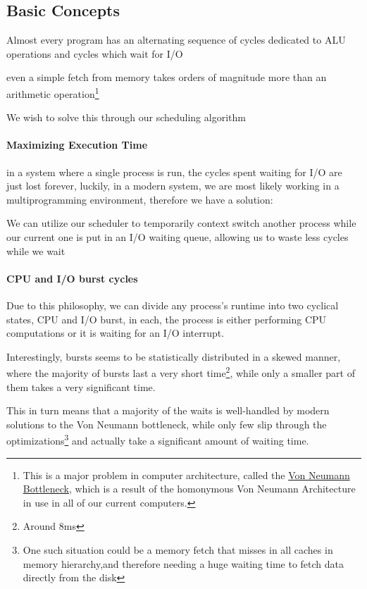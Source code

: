 \documentclass[openright, twoside]{report}
\theoremstyle{definition}
\theoremstyle{example}
\begin{document}
		\subsection{Basic Concepts}
			Almost every program has an alternating sequence of cycles dedicated 
			to ALU operations and cycles which wait for I/O

			even a simple fetch from memory takes orders of magnitude more than an
			arithmetic operation\footnote{This is a major problem in computer architecture, called the 
			\href{https://en.wikipedia.org/wiki/Von_Neumann_architecture\#Von_Neumann_bottleneck}{Von Neumann Bottleneck},
			which is a result of the homonymous Von Neumann Architecture in use in all of our current computers.
			}

			We wish to solve this through our scheduling algorithm 
			
			\paragraph{Maximizing Execution Time}
				in a system where a single process is run, the cycles spent waiting for 
				I/O are just lost forever, luckily, in a modern system, we are most likely 
				working in a multiprogramming environment, therefore we have a solution:

				We can utilize our scheduler to temporarily context switch another process 
				while our current one is put in an I/O waiting queue, allowing us to waste 
				less cycles while we wait

			\paragraph{CPU and I/O burst cycles}
				Due to this philosophy, we can divide any process's runtime into two 
				cyclical states, CPU and I/O burst, in each, the process is either 
				performing CPU computations or it is waiting for an I/O interrupt.

				Interestingly, bursts seems to be statistically distributed in a skewed 
				manner, where the majority of bursts last a very short time\footnote{Around 8ms},
				while only a smaller part of them takes a very significant time.

				This in turn means that a majority of the waits is well-handled by modern solutions 
				to the Von Neumann bottleneck, while only few slip through the optimizations\footnote{One such situation
				could be a memory fetch that misses in all caches in memory hierarchy,and therefore needing a huge waiting time
				to fetch data directly from the disk} and actually take a significant amount of waiting time.
\end{document}
